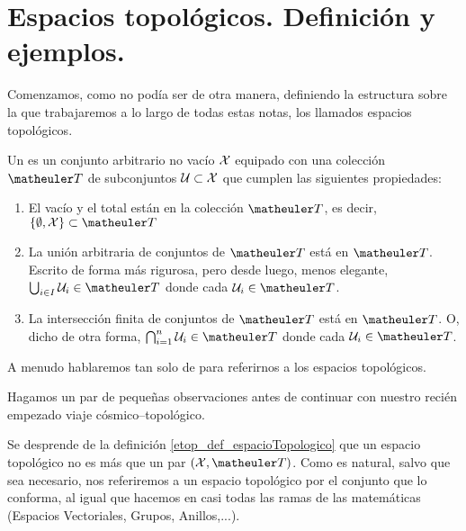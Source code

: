 \section{Espacios topológicos. Definición y ejemplos.}
\label{etop_definicionEjemplos}
Comenzamos, como no podía ser de otra manera, definiendo la estructura sobre la que trabajaremos a lo largo de todas estas notas, los llamados espacios topológicos.
\begin{defi}[Espacio topológico]
	\label{etop_def_espacioTopologico}
	Un  es un conjunto arbitrario no vacío $\mathcal{X}$ equipado con una colección $\T$ de subconjuntos $\mathcal{U}\subset\mathcal{X}$ que cumplen las siguientes propiedades:
	\begin{enumerate}
		\item El vacío y el total están en la colección $\T$, es decir, $\{\emptyset, \X\} \subset \T$
		\item La unión arbitraria de conjuntos de $\T$ está en $\T$. Escrito de forma más rigurosa, pero desde luego, menos elegante, 
		$\bigcup_{i\in I}\U_i\in\T$ donde cada $\U_i\in\T$.
		\item La intersección finita de conjuntos de $\T$ está en $\T$. O, dicho de otra forma, $\bigcap_{i=1}^{n}\U_i\in\T$ donde cada $\U_i\in\T$.
	\end{enumerate}
	A menudo hablaremos tan solo de  para referirnos a los espacios topológicos.
\end{defi}
Hagamos un par de pequeñas observaciones antes de continuar con nuestro recién empezado viaje cósmico--topológico.
\begin{obs}[Sutilezas]
	\label{etop_obs_sutilezas}
	Se desprende de la definición \ref{etop_def_espacioTopologico} que un espacio topológico no es más que un par $(\X, \T)$. Como es natural, salvo que sea necesario, nos referiremos a un espacio topológico por el conjunto que lo conforma, al igual que hacemos en casi todas las ramas de las matemáticas (Espacios Vectoriales, Grupos, Anillos,...).
\end{obs}
